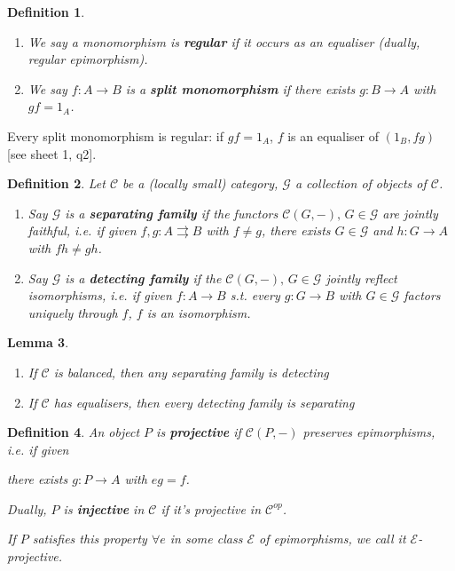 \documentclass[a4paper]{article}
\newtheorem{definition}{Definition}
\newtheorem{lemma}[definition]{Lemma}
\numberwithin{definition}{section}
\begin{document}
\begin{definition}
	\begin{enumerate}[label=\alph*.]
		\item We say a monomorphism is \textbf{regular} if it occurs as an equaliser (dually, regular epimorphism).
		\item We say $f: A \to B$ is a \textbf{split monomorphism} if there exists $g: B \to A$ with $gf = 1_A$.
	\end{enumerate}
\end{definition}

Every split monomorphism is regular:
if $gf = 1_A$, $f$ is an equaliser of $(1_B, fg)$ [see sheet 1, q2].

\begin{definition}
	Let $\mathcal{C}$ be a (locally small) category, $\mathcal{G}$ a collection of objects of $\mathcal{C}$.
	\begin{enumerate}[label=\alph*.]
		\item Say $\mathcal{G}$ is a \textbf{separating family} if the functors $\mathcal{C}(G, -),\, G \in \mathcal{G}$ are jointly faithful,
		i.e. if given $f,g : A \rightrightarrows B$ with $f \neq g$,
		there exists $G \in \mathcal{G}$ and $h: G \to A$ with $fh \neq gh$.
		\item Say $\mathcal{G}$ is a \textbf{detecting family} if the $\mathcal{C}(G, -),\, G \in \mathcal{G}$ jointly reflect isomorphisms,
		i.e. if given $f: A \to B$ s.t. every $g: G \to B$ with $G \in \mathcal{G}$ factors uniquely through $f$,
		$f$ is an isomorphism.
	\end{enumerate}
\end{definition}

\begin{lemma}
	\begin{enumerate}[label=\roman*.]
		\item If $\mathcal{C}$ is balanced, then any separating family is detecting
		\item If $\mathcal{C}$ has equalisers, then every detecting family is separating
	\end{enumerate}
\end{lemma}

\begin{definition}
	An object $P$ is \textbf{projective} if $\mathcal{C}(P, -)$ preserves epimorphisms, i.e. if given
	\begin{center}
	\end{center}
	there exists $g: P \to A$ with $eg = f$.
	
	Dually, $P$ is \textbf{injective} in $\mathcal{C}$ if it's projective in $\mathcal{C}^{op}$.
	
	If $P$ satisfies this property $\forall e$ in some class $\mathcal{E}$ of epimorphisms,
	we call it $\mathcal{E}$-projective.
\end{definition}
\end{document}
